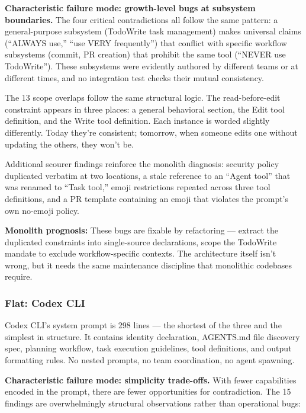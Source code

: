 \textbf{Characteristic failure mode: growth-level bugs at subsystem
boundaries.} The four critical contradictions all follow the same
pattern: a general-purpose subsystem (TodoWrite task management) makes
universal claims (``ALWAYS use,'' ``use VERY frequently'') that conflict
with specific workflow subsystems (commit, PR creation) that prohibit
the same tool (``NEVER use TodoWrite''). These subsystems were evidently
authored by different teams or at different times, and no integration
test checks their mutual consistency.

The 13 scope overlaps follow the same structural logic. The
read-before-edit constraint appears in three places: a general
behavioral section, the Edit tool definition, and the Write tool
definition. Each instance is worded slightly differently. Today they're
consistent; tomorrow, when someone edits one without updating the
others, they won't be.

Additional scourer findings reinforce the monolith diagnosis: security
policy duplicated verbatim at two locations, a stale reference to an
``Agent tool'' that was renamed to ``Task tool,'' emoji restrictions
repeated across three tool definitions, and a PR template containing an
emoji that violates the prompt's own no-emoji policy.

\textbf{Monolith prognosis:} These bugs are fixable by refactoring ---
extract the duplicated constraints into single-source declarations,
scope the TodoWrite mandate to exclude workflow-specific contexts. The
architecture itself isn't wrong, but it needs the same maintenance
discipline that monolithic codebases require.

\subsubsection{Flat: Codex CLI}

Codex CLI's system prompt is 298 lines --- the shortest of the three and
the simplest in structure. It contains identity declaration, AGENTS.md
file discovery spec, planning workflow, task execution guidelines, tool
definitions, and output formatting rules. No nested prompts, no team
coordination, no agent spawning.

\textbf{Characteristic failure mode: simplicity trade-offs.} With fewer
capabilities encoded in the prompt, there are fewer opportunities for
contradiction. The 15 findings are overwhelmingly structural
observations rather than operational bugs:

